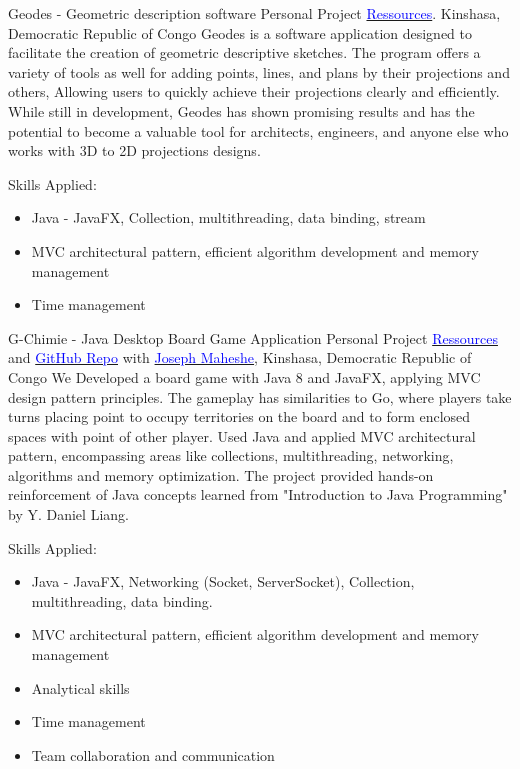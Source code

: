     {Geodes - Geometric description software}
    {Personal Project}
    {\href{https://disk.yandex.ru/d/mz6n2ciERA7q4Q}{\textcolor{blue}{Ressources}}. 
     Kinshasa, Democratic Republic of Congo
    }
    {
    \newline
    Geodes is a software application designed to facilitate the creation of geometric descriptive sketches.
    The program offers a variety of tools as well for adding points, lines, and plans by their projections and others,
    Allowing users to quickly achieve their projections clearly and efficiently. While still in development, Geodes has shown promising results and has the potential to become a valuable tool for architects,
    engineers, and anyone else who works with 3D to 2D projections designs.
    }
    {
    Skills Applied:
    \begin{itemize}
        \item Java - JavaFX,  Collection, multithreading, data binding, stream
        \item MVC architectural pattern, efficient algorithm development and memory management
        \item Time management
    \end{itemize}
    }

\vspace{2mm}

    {G-Chimie - Java Desktop Board Game Application}
    {Personal Project}
    {\href{https://disk.yandex.ru/d/mMRjdkn2VyuJEw}{\textcolor{blue}{Ressources}} and 
    \href{https://github.com/DanGlChris/G-Chimie}{\textcolor{blue}{GitHub Repo}} 
    with \href{linkedin.com/in/maheshejs}{\textcolor{blue}{Joseph Maheshe}},
    Kinshasa, Democratic Republic of Congo
    }
    {
    \newline
    We Developed a board game with Java 8 and JavaFX, applying MVC design pattern principles. 
    The gameplay has similarities to Go, where players take turns placing point to occupy 
    territories on the board and to form enclosed spaces with point of other player.
    Used Java and applied MVC architectural pattern, encompassing areas like collections, multithreading, networking, algorithms and memory optimization. 
    The project provided hands-on reinforcement of Java concepts learned from "Introduction to Java Programming" by Y. Daniel Liang.
    }
    {
    Skills Applied:
    \begin{itemize}
        \item Java - JavaFX, Networking (Socket, ServerSocket), Collection, multithreading, data binding.
        \item MVC architectural pattern, efficient algorithm development and memory management
        \item Analytical skills
        \item Time management
        \item Team collaboration and communication
    \end{itemize}
    }